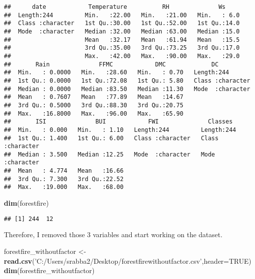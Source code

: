 \documentclass[
]{article}
\newenvironment{Shaded}{\begin{snugshade}}{\end{snugshade}}
\newcommand{\DataTypeTok}[1]{\textcolor[rgb]{0.13,0.29,0.53}{#1}}
\newcommand{\KeywordTok}[1]{\textcolor[rgb]{0.13,0.29,0.53}{\textbf{#1}}}
\newcommand{\NormalTok}[1]{#1}
\newcommand{\OtherTok}[1]{\textcolor[rgb]{0.56,0.35,0.01}{#1}}
\newcommand{\StringTok}[1]{\textcolor[rgb]{0.31,0.60,0.02}{#1}}
\begin{document}
\begin{verbatim}
##      date            Temperature          RH              Ws      
##  Length:244         Min.   :22.00   Min.   :21.00   Min.   : 6.0  
##  Class :character   1st Qu.:30.00   1st Qu.:52.00   1st Qu.:14.0  
##  Mode  :character   Median :32.00   Median :63.00   Median :15.0  
##                     Mean   :32.17   Mean   :61.94   Mean   :15.5  
##                     3rd Qu.:35.00   3rd Qu.:73.25   3rd Qu.:17.0  
##                     Max.   :42.00   Max.   :90.00   Max.   :29.0  
##       Rain              FFMC            DMC             DC           
##  Min.   : 0.0000   Min.   :28.60   Min.   : 0.70   Length:244        
##  1st Qu.: 0.0000   1st Qu.:72.08   1st Qu.: 5.80   Class :character  
##  Median : 0.0000   Median :83.50   Median :11.30   Mode  :character  
##  Mean   : 0.7607   Mean   :77.89   Mean   :14.67                     
##  3rd Qu.: 0.5000   3rd Qu.:88.30   3rd Qu.:20.75                     
##  Max.   :16.8000   Max.   :96.00   Max.   :65.90                     
##       ISI              BUI            FWI              Classes         
##  Min.   : 0.000   Min.   : 1.10   Length:244         Length:244        
##  1st Qu.: 1.400   1st Qu.: 6.00   Class :character   Class :character  
##  Median : 3.500   Median :12.25   Mode  :character   Mode  :character  
##  Mean   : 4.774   Mean   :16.66                                        
##  3rd Qu.: 7.300   3rd Qu.:22.52                                        
##  Max.   :19.000   Max.   :68.00
\end{verbatim}

\begin{Shaded}
\begin{Highlighting}[]
\KeywordTok{dim}\NormalTok{(forestfire)}
\end{Highlighting}
\end{Shaded}

\begin{verbatim}
## [1] 244  12
\end{verbatim}

Therefore, I removed those 3 variables and start working on the dataset.

\begin{Shaded}
\begin{Highlighting}[]
\NormalTok{forestfire_withoutfactor <-}\StringTok{ }\KeywordTok{read.csv}\NormalTok{(}\StringTok{'C:/Users/srabba2/Desktop/forestfirewithoutfactor.csv'}\NormalTok{,}\DataTypeTok{header=}\OtherTok{TRUE}\NormalTok{)}
\KeywordTok{dim}\NormalTok{(forestfire_withoutfactor)}
\end{Highlighting}
\end{Shaded}
\end{document}
